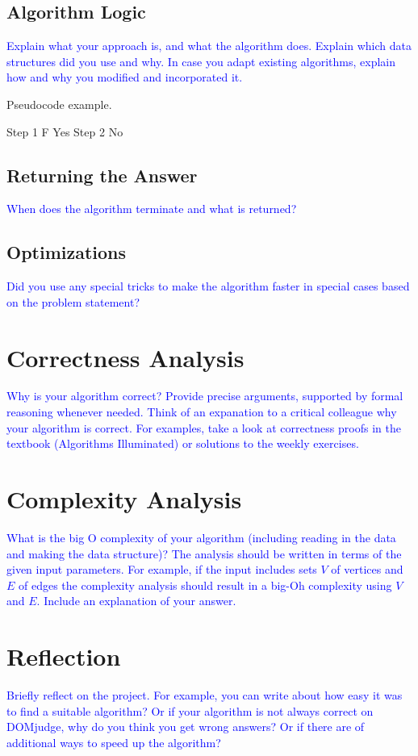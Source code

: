 \documentclass[a4paper]{article}
\newcommand{\instruction}[1]{\textcolor{blue}{#1}}
\begin{document}
\subsection{Algorithm Logic}
\instruction{Explain what your approach is, and what the algorithm does. Explain which data structures did you use and why. In case you adapt existing algorithms, explain how and why you modified and incorporated it.}

\begin{algorithm}[h!]
    \caption{Pseudocode example.}
    \label{pseudocode}
    \begin{algorithmic}[1]
    \State Step 1
     F
    \State \Return Yes
    \Else 
    \State Step 2
    \EndIf
    \EndWhile 
    \State \Return No
    \EndFunction
    \end{algorithmic}
    \end{algorithm}

\subsection{Returning the Answer}
\instruction{When does the algorithm terminate and what is returned?}

\subsection{Optimizations}
\instruction{Did you use any special tricks to make the algorithm faster in special cases based on the problem statement?}

\section{Correctness Analysis}
\instruction{Why is your algorithm correct? Provide precise arguments, supported by formal reasoning whenever needed. Think of an expanation to a critical colleague why your algorithm is correct. For examples, take a look at correctness proofs in the textbook (Algorithms Illuminated) or solutions to the weekly exercises.}


\section{Complexity Analysis}
\instruction{What is the big O complexity of your algorithm (including reading in the data and making the data structure)? The analysis should be written in terms of the given input parameters. For example, if the input includes sets $V$ of vertices and $E$ of edges the complexity analysis should result in a big-Oh complexity using $V$ and $E$. Include an explanation of your answer.} 


\section{Reflection}
\instruction{Briefly reflect on the project. For example, you can write about how easy it was to find a suitable algorithm? Or if your algorithm is not always correct on DOMjudge, why do you think you get wrong answers? Or if there are of additional ways to speed up the algorithm?}
\end{document}
